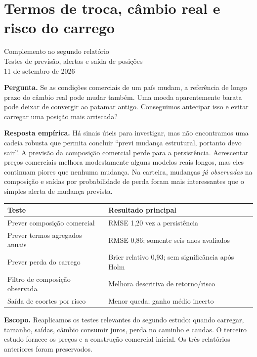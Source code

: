 \documentclass[11pt,a4paper]{article}
\begin{document}
\section*{Termos de troca, câmbio real e risco do carrego}
\begin{center}\large Complemento ao segundo relatório\\[5pt]\normalsize Testes de previsão, alertas e saída de posições\\11 de setembro de 2026\end{center}
\vspace{8pt}
\textbf{Pergunta.} Se as condições comerciais de um país mudam, a referência de longo prazo do câmbio real pode mudar também. Uma moeda aparentemente barata pode deixar de convergir ao patamar antigo. Conseguimos antecipar isso e evitar carregar uma posição mais arriscada?

\textbf{Resposta empírica.} Há sinais úteis para investigar, mas não encontramos uma cadeia robusta que permita concluir ``previ mudança estrutural, portanto devo sair''. A previsão da composição comercial perde para a persistência. Acrescentar preços comerciais melhora modestamente alguns modelos reais longos, mas eles continuam piores que nenhuma mudança. Na carteira, mudanças \emph{já observadas} na composição e saídas por probabilidade de perda foram mais interessantes que o simples alerta de mudança prevista.
\small\begin{center}\begin{tabular}{ll}\toprule Teste & Resultado principal\\\midrule 
Prever composição comercial & RMSE 1,20 vez a persistência\\
Prever termos agregados anuais & RMSE 0,86; somente seis anos avaliados\\
Prever perda do carrego & Brier relativo 0,93; sem significância após Holm\\
Filtro de composição observada & Melhora descritiva de retorno/risco\\
Saída de coortes por risco & Menor queda; ganho médio incerto\\\bottomrule\end{tabular}\end{center}\normalsize

\textbf{Escopo.} Reaplicamos os testes relevantes do segundo estudo: quando carregar, tamanho, saídas, câmbio consumir juros, perda no caminho e caudas. O terceiro estudo fornece os preços e a construção comercial inicial. Os três relatórios anteriores foram preservados.
\end{document}
